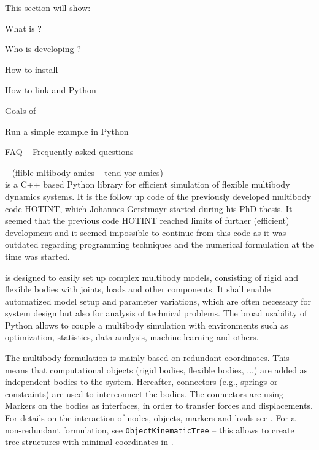 This section will show:
\bn
  \item What is \codeName ?
  \item Who is developing \codeName ?
  \item How to install \codeName 
  \item How to link \codeName and Python
  \item Goals of \codeName
  \item Run a simple example in Python
  \item FAQ -- Frequently asked questions
\en

\codeName -- (flible mltibody amics  -- tend yor amics) \vspace{6pt}\\
\noindent \codeName is a C++ based Python library for efficient simulation of flexible multibody dynamics systems.
It is the follow up code of the previously developed multibody code HOTINT, which Johannes Gerstmayr started during his PhD-thesis.
It seemed that the previous code HOTINT reached limits of further (efficient) development and it seemed impossible to continue from this code as it was outdated regarding programming techniques and the numerical formulation at the time \codeName was started.

\codeName is designed to easily set up complex multibody models, consisting of rigid and flexible bodies with joints, loads and other components. It shall enable automatized model setup and parameter variations, which are often necessary for system design but also for analysis of technical problems. The broad usability of Python allows to couple a multibody simulation with environments such as optimization, statistics, data analysis, machine learning and others.

The multibody formulation is mainly based on redundant coordinates. This means that computational objects (rigid bodies, flexible bodies, ...) are added as independent bodies to the system. Hereafter, connectors (e.g., springs or constraints) are used to interconnect the bodies. The connectors are using Markers on the bodies as interfaces, in order to transfer forces and displacements.
For details on the interaction of nodes, objects, markers and loads see . For a non-redundant formulation, see \texttt{ObjectKinematicTree} -- this allows to create tree-structures with minimal coordinates in \codeName.

